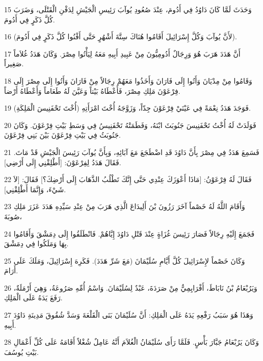 \par 15 وَحَدَثَ لَمَّا كَانَ دَاوُدُ فِي أَدُومَ، عِنْدَ صُعُودِ يُوآبَ رَئِيسِ الْجَيْشِ لِدَفْنِ الْقَتْلَى، وَضَرَبَ كُلَّ ذَكَرٍ فِي أَدُومَ.
\par 16 (لأَنَّ يُوآبَ وَكُلَّ إِسْرَائِيلَ أَقَامُوا هُنَاكَ سِتَّةَ أَشْهُرٍ حَتَّى أَفْنُوا كُلَّ ذَكَرٍ فِي أَدُومَ).
\par 17 أَنَّ هَدَدَ هَرَبَ هُوَ وَرِجَالٌ أَدُومِيُّونَ مِنْ عَبِيدِ أَبِيهِ مَعَهُ لِيَأْتُوا مِصْرَ. وَكَانَ هَدَدُ غُلاَماً صَغِيراً.
\par 18 وَقَامُوا مِنْ مِدْيَانَ وَأَتُوا إِلَى فَارَانَ وَأَخَذُوا مَعَهُمْ رِجَالاً مِنْ فَارَانَ وَأَتُوا إِلَى مِصْرَ إِلَى فِرْعَوْنَ مَلِكِ مِصْرَ، فَأَعْطَاهُ بَيْتاً وَعَيَّنَ لَهُ طَعَاماً وَأَعْطَاهُ أَرْضاً.
\par 19 فَوَجَدَ هَدَدُ نِعْمَةً فِي عَيْنَيْ فِرْعَوْنَ جِدّاً، وَزَوَّجَهُ أُخْتَ امْرَأَتِهِ (أُخْتَ تَحْفَنِيسَ الْمَلِكَةِ).
\par 20 فَوَلَدَتْ لَهُ أُخْتُ تَحْفَنِيسَ جَنُوبَثَ ابْنَهُ، وَفَطَمَتْهُ تَحْفَنِيسُ فِي وَسَطِ بَيْتِ فِرْعَوْنَ. وَكَانَ جَنُوبَثُ فِي بَيْتِ فِرْعَوْنَ بَيْنَ بَنِي فِرْعَوْنَ.
\par 21 فَسَمِعَ هَدَدُ فِي مِصْرَ بِأَنَّ دَاوُدَ قَدِ اضْطَجَعَ مَعَ آبَائِهِ، وَبِأَنَّ يُوآبَ رَئِيسَ الْجَيْشِ قَدْ مَاتَ. فَقَالَ هَدَدُ لِفِرْعَوْنَ: [أَطْلِقْنِي إِلَى أَرْضِي].
\par 22 فَقَالَ لَهُ فِرْعَوْنُ: [مَاذَا أَعْوَزَكَ عِنْدِي حَتَّى إِنَّكَ تَطْلُبُ الذَّهَابَ إِلَى أَرْضِكَ؟] فَقَالَ: [لاَ شَيْءَ، وَإِنَّمَا أَطْلِقْنِي].
\par 23 وَأَقَامَ اللَّهُ لَهُ خَصْماً آخَرَ رَزُونَ بْنَ أَلِيدَاعَ الَّذِي هَرَبَ مِنْ عِنْدِ سَيِّدِهِ هَدَدَ عَزَرَ مَلِكِ صُوبَةَ،
\par 24 فَجَمَعَ إِلَيْهِ رِجَالاً فَصَارَ رَئِيسَ غُزَاةٍ عِنْدَ قَتْلِ دَاوُدَ إِيَّاهُمْ. فَانْطَلَقُوا إِلَى دِمَشْقَ وَأَقَامُوا بِهَا وَمَلَكُوا فِي دِمَشْقَ.
\par 25 وَكَانَ خَصْماً لإِسْرَائِيلَ كُلَّ أَيَّامِ سُلَيْمَانَ (مَعَ شَرِّ هَدَدَ). فَكَرِهَ إِسْرَائِيلَ، وَمَلَكَ عَلَى أَرَامَ.
\par 26 وَيَرُبْعَامُ بْنُ نَابَاطَ، أَفْرَايِمِيٌّ مِنْ صَرَدَةَ، عَبْدٌ لِسُلَيْمَانَ. وَاسْمُ أُمِّهِ صَرُوعَةُ، وَهِيَ أَرْمَلَةٌ، رَفَعَ يَدَهُ عَلَى الْمَلِكِ.
\par 27 وَهَذَا هُوَ سَبَبُ رَفْعِهِ يَدَهُ عَلَى الْمَلِكِ: أَنَّ سُلَيْمَانَ بَنَى الْقَلْعَةَ وَسَدَّ شُقُوقَ مَدِينَةِ دَاوُدَ أَبِيهِ.
\par 28 وَكَانَ يَرُبْعَامُ جَبَّارَ بَأْسٍ. فَلَمَّا رَأَى سُلَيْمَانُ الْغُلاَمَ أَنَّهُ عَامِلٌ شُغْلاً أَقَامَهُ عَلَى كُلِّ أَعْمَالِ بَيْتِ يُوسُفَ.
